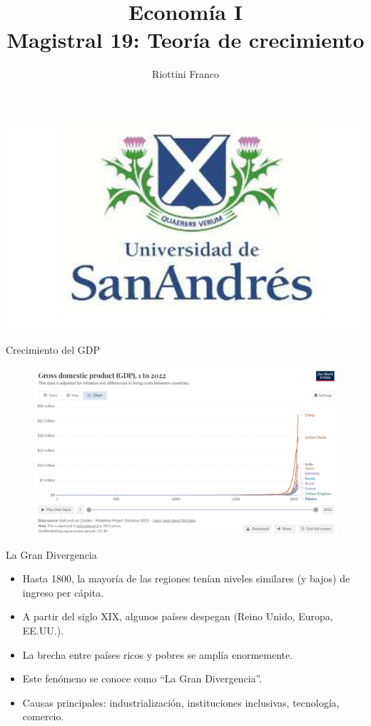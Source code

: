 \documentclass{beamer}
\title[Economía I]{Economía I \vspace{4mm}
\\ Magistral 19: Teoría de crecimiento}
\date{}
\author[Franco Riottini]{Riottini Franco}
\institute[]{Universidad de San Andrés}
\begin{document}
\begin{frame}
\titlepage
\centering

\includegraphics[scale=0.2]{../Figures/logoUDESA.jpg} 
\end{frame}

\begin{frame}{Crecimiento del GDP}
    \begin{figure} [H]   
        \includegraphics[scale=0.4]{../Figures/gdp_growth_ourworldindata.png}
    \end{figure}
\end{frame}


\begin{frame}{La Gran Divergencia}
    \begin{itemize}
        \item Hasta 1800, la mayoría de las regiones tenían niveles similares (y bajos) de ingreso per cápita.
        \item A partir del siglo XIX, algunos países despegan (Reino Unido, Europa, EE.UU.).
        \item La brecha entre países ricos y pobres se amplía enormemente.
        \item Este fenómeno se conoce como “La Gran Divergencia”.
        \item Causas principales: industrialización, instituciones inclusivas, tecnología, comercio.
    \end{itemize}
\end{frame}
\end{document}
